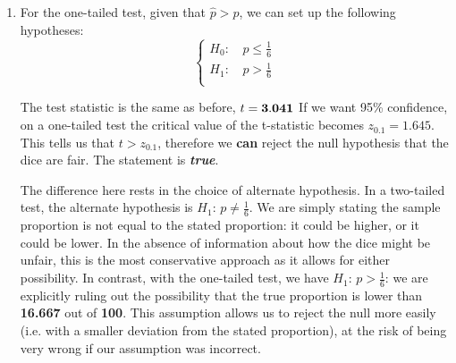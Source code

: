 \documentclass[a4paper, leqno, 12pt]{report}
\newenvironment{top_enumerate}{
\begin{enumerate}
  \setlength{\itemsep}{2em}
  \setlength{\topsep}{-0pt}
  \setlength{\partopsep}{-0pt}
}{\end{enumerate}}
\begin{document}
\begin{top_enumerate}
\begin{enumerate}
	The hypotheses we want to test are:
	\[
	\left\{\begin{aligned}
	H_0: \, & p = \frac{1}{6} \\
	H_1: \, & p \ne \frac{1}{6} \\
	\end{aligned}\right.
	\]
	
	The test statistic is:
	\[
	t = \frac{\hat p - p}{\frac{\sigma}{\sqrt{n}}} = \frac{{\bf 0.28}-\frac{1}{6}}{\sqrt{\frac{5}{36\times{\bf 100}}}} = \frac{{\bf 0.113}}{{\bf 0.037}} = {\bf 3.041}
	\]
	
	Given that we want 95\% confidence on a two-tailed test with a sample size of $n={\bf 100}$, the critical value of the t-statistic is $z_{0.05} = 1.96$. This tells us that $t < z_{0.02}$, therefore there is {\bf   }enough evidence to reject the null hypothesis that the dice are fair. The statement is \emph{{\bf true}}.
	 \quad \textbf{}
		\item For the one-tailed test, given that $\hat p > p$, we can set up the following hypotheses:
	\[
	\left\{\begin{aligned}
	H_0: \, & p \le \frac{1}{6} \\
	H_1: \, & p > \frac{1}{6} \\
	\end{aligned}\right.
	\]
	
	The  test statistic is the same as before, $t = {\bf 3.041}$ If we want 95\% confidence, on a one-tailed test the critical value of the t-statistic becomes $z_{0.1} = 1.645$. This tells us that $t > z_{0.1}$, therefore we {\bf  can  }reject the null hypothesis that the dice are fair. The statement is \emph{{\bf true}}.
	
	The difference here rests in the choice of alternate hypothesis. In a two-tailed test, the alternate hypothesis is $H_1: \, p \ne \frac{1}{6}$. We are simply stating the sample proportion is not equal to the stated proportion: it could be higher, or it could be lower. In the absence of information about how the dice might be unfair, this is the most conservative approach as it allows for either possibility. In contrast, with the one-tailed test, we have $H_1: \, p > \frac{1}{6}$: we are explicitly ruling out the possibility that the true proportion is lower than {\bf 16.667} out of {\bf 100}. This assumption allows us to reject the null more easily (i.e. with a smaller deviation from the stated proportion), at the risk of being very wrong if our assumption was incorrect.
	

\end{enumerate}
\end{top_enumerate}
\end{document}
